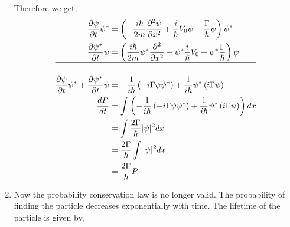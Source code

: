 \documentclass[addpoints]{exam}
\theoremstyle{mytheoremstyle}
\theoremstyle{mytheoremstyle}
\theoremstyle{myproblemstyle}
\begin{document}
\begin{questions}
\begin{solution}
\begin{enumerate}
\begin{equation*}
			      \end{equation*}
			      Therefore we get,
			      \begin{equation*}
				      \begin{aligned}
					      \frac{\partial\psi}{\partial t}\psi^{*}                                         & = \left(-\frac{i\hslash}{2m}\frac{\partial^2\psi}{\partial x^2}+\frac{i}{\hslash}V_0\psi+\frac{\Gamma}{\hslash}\psi\right)\psi^{*}        \\
					      \frac{\partial\psi^{*}}{\partial t}\psi                                         & = \left(\frac{i\hslash}{2m}\psi^{*}\frac{\partial^2}{\partial x^2}-\psi^{*}\frac{i}{\hslash}V_0+\psi^{*}\frac{\Gamma}{\hslash}\right)\psi \\
					      \hline                                                                                                                                                                                                                      \\
					      \frac{\partial\psi}{\partial t}\psi^{*}+\frac{\partial\psi^{*}}{\partial t}\psi & = -\frac{1}{i\hslash}\left(-i\Gamma\psi\psi^{*}\right)+\frac{1}{i\hslash}\psi^{*}\left(i\Gamma\psi\right)                                 \\
					      \frac{dP}{dt}                                                                   & = \int \left(-\frac{1}{i\hslash}\left(-i\Gamma\psi\psi^{*}\right)+\frac{1}{i\hslash}\psi^{*}\left(i\Gamma\psi\right)\right)dx             \\
					                                                                                      & = \int \frac{2\Gamma}{\hslash}|\psi|^2dx                                                                                                  \\
					                                                                                      & = \frac{2\Gamma}{\hslash}\int |\psi|^2dx                                                                                                  \\
					                                                                                      & = \frac{2\Gamma}{\hslash}P                                                                                                                \\
				      \end{aligned}
			      \end{equation*}
			\item Now the probability conservation law is no longer valid. The probability of finding the particle decreases exponentially with time. The lifetime of the particle is given by,

\end{enumerate}
\end{solution}
\end{questions}
\end{document}
